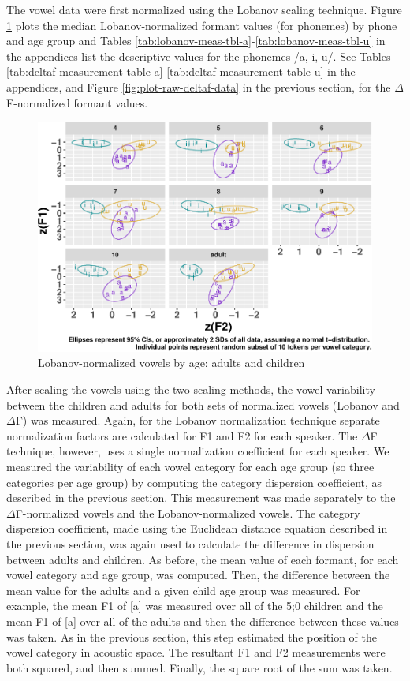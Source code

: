 \documentclass[
]{article}
\begin{document}
The vowel data were first normalized using the Lobanov scaling technique. Figure \ref{fig:plot-raw-lobanov-data} plots the median Lobanov-normalized formant values (for phonemes) by phone and age group and Tables \ref{tab:lobanov-meas-tbl-a}-\ref{tab:lobanov-meas-tbl-u} in the appendices list the descriptive values for the phonemes /a, i, u/. See Tables \ref{tab:deltaf-measurement-table-a}-\ref{tab:deltaf-measurement-table-u} in the appendices, and Figure \ref{fig:plot-raw-deltaf-data} in the previous section, for the \(\Delta\)F-normalized formant values.

\begin{figure}
\centering
\includegraphics{3_vtl_results_files/figure-latex/plot-raw-lobanov-data-1.pdf}
\caption{\label{fig:plot-raw-lobanov-data}Lobanov-normalized vowels by age:
adults and children}
\end{figure}

After scaling the vowels using the two scaling methods, the vowel variability between the children and adults for both sets of normalized vowels (Lobanov and \(\Delta\)F) was measured. Again, for the Lobanov normalization technique separate normalization factors are calculated for F1 and F2 for each speaker. The \(\Delta\)F technique, however, uses a single normalization coefficient for each speaker. We measured the variability of each vowel category for each age group (so three categories per age group) by computing the category dispersion coefficient, as described in the previous section. This measurement was made separately to the \(\Delta\)F-normalized vowels and the Lobanov-normalized vowels.
The category dispersion coefficient, made using the Euclidean distance equation described in the previous section, was again used to calculate the difference in dispersion between adults and children. As before, the mean value of each formant, for each vowel category and age group, was computed. Then, the difference between the mean value for the adults and a given child age group was measured. For example, the mean F1 of {[}a{]} was measured over all of the 5;0 children and the mean F1 of {[}a{]} over all of the adults and then the difference between these values was taken. As in the previous section, this step estimated the position of the vowel category in acoustic space. The resultant F1 and F2 measurements were both squared, and then summed. Finally, the square root of the sum was taken.
\end{document}
